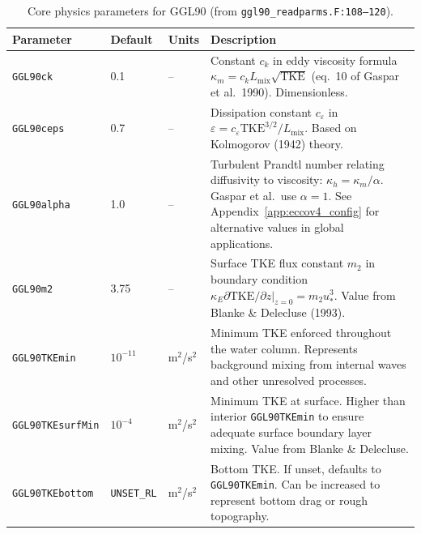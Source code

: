 \documentclass[12pt,letterpaper]{article}
\newcommand{\TKE}{\mathrm{TKE}}
\newcommand{\KM}{\kappa_m}
\newcommand{\KH}{\kappa_h}
\newcommand{\KE}{\kappa_E}
\newcommand{\Lmix}{L_{\mathrm{mix}}}
\begin{document}
\begin{table}[h!]
\centering
\caption{Core physics parameters for GGL90 (from \texttt{ggl90\_readparms.F:108--120}).}
\label{tab:core_params}
\small
\begin{tabular}{@{}lllp{6cm}@{}}
\toprule
\textbf{Parameter} & \textbf{Default} & \textbf{Units} & \textbf{Description} \\
\midrule
\texttt{GGL90ck} & 0.1 & -- & Constant $c_k$ in eddy viscosity formula
                                $\KM = c_k \Lmix \sqrt{\TKE}$ (eq.\ 10 of Gaspar
                                et al.\ 1990). Dimensionless. \\[6pt]

\texttt{GGL90ceps} & 0.7 & -- & Dissipation constant $c_\varepsilon$ in
                                $\varepsilon = c_\varepsilon \TKE^{3/2}/\Lmix$.
                                Based on Kolmogorov (1942) theory. \\[6pt]

\texttt{GGL90alpha} & 1.0 & -- & Turbulent Prandtl number relating diffusivity
                                 to viscosity: $\KH = \KM / \alpha$. Gaspar
                                 et al.\ use $\alpha=1$. See
                                 Appendix~\ref{app:eccov4_config} for alternative
                                 values in global applications. \\[6pt]

\texttt{GGL90m2} & 3.75 & -- & Surface TKE flux constant $m_2$ in boundary
                               condition $\KE \partial\TKE/\partial z|_{z=0} =
                               m_2 u_*^3$. Value from Blanke \& Delecluse (1993). \\[6pt]

\texttt{GGL90TKEmin} & $10^{-11}$ & m$^2$/s$^2$ & Minimum TKE enforced
                                    throughout the water column. Represents
                                    background mixing from internal waves and
                                    other unresolved processes. \\[6pt]

\texttt{GGL90TKEsurfMin} & $10^{-4}$ & m$^2$/s$^2$ & Minimum TKE at surface.
                                        Higher than interior \texttt{GGL90TKEmin}
                                        to ensure adequate surface boundary layer
                                        mixing. Value from Blanke \& Delecluse. \\[6pt]

\texttt{GGL90TKEbottom} & \texttt{UNSET\_RL} & m$^2$/s$^2$ & Bottom TKE.
                                                If unset, defaults to
                                                \texttt{GGL90TKEmin}. Can be
                                                increased to represent bottom
                                                drag or rough topography. \\[6pt]


\end{tabular}
\end{table}
\end{document}
